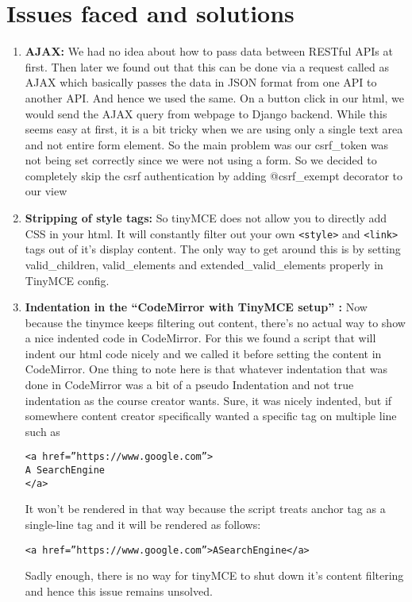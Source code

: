 \section{Issues faced and solutions}
\begin{enumerate}

\item\textbf{AJAX:}\newline\newline
We had no idea about how to pass data between RESTful APIs at first. Then later we
found out that this can be done via a request called as AJAX which basically passes
the data in JSON format from one API to another API. And hence we used the same.
On a button click in our html, we would send the AJAX query from webpage to
Django backend. While this seems easy at first, it is a bit tricky when we are using
only a single text area and not entire form element. So the main problem was our
csrf\_token was not being set correctly since we were not using a form. So we
decided to completely skip the csrf authentication by adding @csrf\_exempt
decorator to our view

\item\textbf{Stripping of style tags:}\newline\newline
So tinyMCE does not allow you to directly add CSS in your html. It will constantly
filter out your own \verb=<style>= and \verb=<link>= tags out of it’s display content. The only way
to get around this is by setting valid\_children, valid\_elements and
extended\_valid\_elements properly in TinyMCE config.

\item\textbf{Indentation in the “CodeMirror with TinyMCE setup” :}\newline\newline
Now because the tinymce keeps filtering out content, there’s no actual way to show a
nice indented code in CodeMirror. For this we found a script that will indent our
html code nicely and we called it before setting the content in CodeMirror. One thing
to note here is that whatever indentation that was done in CodeMirror was a bit of a
pseudo Indentation and not true indentation as the course creator wants. Sure, it was
nicely indented, but if somewhere content creator specifically wanted a specific tag
on multiple line such as
\begin{verbatim}
<a href=”https://www.google.com”>
A SearchEngine
</a>
\end{verbatim}
It won’t be rendered in that way because the script treats anchor tag as a single-line
tag and it will be rendered as follows:
\begin{verbatim}
<a href=”https://www.google.com”>ASearchEngine</a>
\end{verbatim}
Sadly enough, there is no way for tinyMCE to shut down it’s content filtering and
hence this issue remains unsolved.



\end{enumerate}
